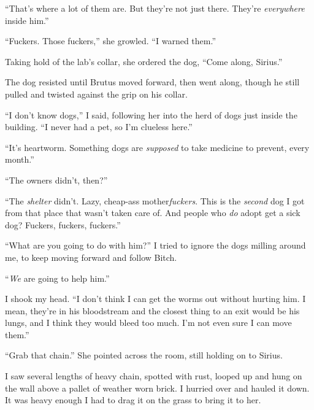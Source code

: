 ``That's where a lot of them are.  But they're not just there.  They're \emph{everywhere} inside him.''



``Fuckers.  Those fuckers,'' she growled.  ``I warned them.''



Taking hold of the lab's collar, she ordered the dog, ``Come along, Sirius.''



The dog resisted until Brutus moved forward, then went along, though he still pulled and twisted against the grip on his collar.



``I don't know dogs,'' I said, following her into the herd of dogs just inside the building.  ``I never had a pet, so I'm clueless here.''



``It's heartworm.  Something dogs are \emph{supposed} to take medicine to prevent, every month.''



``The owners didn't, then?''



``The \emph{shelter} didn't.  Lazy, cheap-ass mother\emph{fuckers}.  This is the \emph{second} dog I got from that place that wasn't taken care of.  And people who \emph{do} adopt get a sick dog?  Fuckers, fuckers, fuckers.''



``What are you going to do with him?''  I tried to ignore the dogs milling around me, to keep moving forward and follow Bitch.



``\emph{We} are going to help him.''



I shook my head.  ``I don't think I can get the worms out without hurting him.  I mean, they're in his bloodstream and the closest thing to an exit would be his lungs, and I think they would bleed too much.  I'm not even sure I can move them.''



``Grab that chain.''  She pointed across the room, still holding on to Sirius.



I saw several lengths of heavy chain, spotted with rust, looped up and hung on the wall above a pallet of weather worn brick.  I hurried over and hauled it down.  It was heavy enough I had to drag it on the grass to bring it to her.



